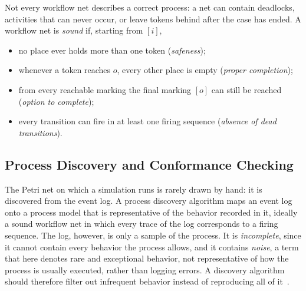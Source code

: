     Not every workflow net describes a correct process: a net can contain
    deadlocks, activities that can never occur, or leave tokens behind after the
    case has ended. A workflow net is \emph{sound} if, starting from $[i]$,
    \begin{itemize}
      \item no place ever holds more than one token (\emph{safeness});
      \item whenever a token reaches $o$, every other place is empty
            (\emph{proper completion});
      \item from every reachable marking the final marking $[o]$ can still be
            reached (\emph{option to complete});
      \item every transition can fire in at least one firing sequence
            (\emph{absence of dead transitions}).
    \end{itemize}

\subsection{Process Discovery and Conformance Checking}
    \label{subsec:bg:simulation:pdisc}
    The Petri net on which a simulation runs is rarely drawn by hand: it is
    discovered from the event log. A process discovery algorithm maps an event log
    onto a process model that is representative of the behavior recorded in it,
    ideally a sound workflow net in which every trace of the log corresponds to a
    firing sequence. The log, however, is only a sample of
    the process. It is \emph{incomplete}, since it cannot contain every behavior
    the process allows, and it contains \emph{noise}, a term that here denotes
    rare and exceptional behavior, not representative of how the process is
    usually executed, rather than logging errors. A discovery algorithm should
    therefore filter out infrequent behavior instead of reproducing all of
    it~\cite{vanderaalst2016}.
    
